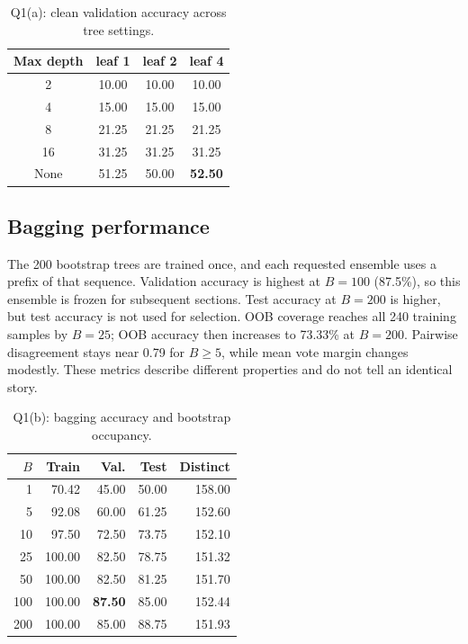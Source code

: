 \documentclass[10pt,twocolumn,letterpaper]{article}
\begin{document}
\begin{table}[t]
\centering
\caption{Q1(a): clean validation accuracy across tree settings.}
\label{tab:q1grid}
\small
\begin{tabular}{c|ccc}
\toprule
Max depth & leaf 1 & leaf 2 & leaf 4\\
\midrule
2 & 10.00 & 10.00 & 10.00\\
4 & 15.00 & 15.00 & 15.00\\
8 & 21.25 & 21.25 & 21.25\\
16 & 31.25 & 31.25 & 31.25\\
None & 51.25 & 50.00 & \textbf{52.50}\\
\bottomrule
\end{tabular}
\end{table}

\subsection{Bagging performance}
The 200 bootstrap trees are trained once, and each requested ensemble uses a prefix of that sequence. Validation accuracy is highest at $B=100$ (87.5\%), so this ensemble is frozen for subsequent sections. Test accuracy at $B=200$ is higher, but test accuracy is not used for selection. OOB coverage reaches all 240 training samples by $B=25$; OOB accuracy then increases to 73.33\% at $B=200$. Pairwise disagreement stays near 0.79 for $B\geq5$, while mean vote margin changes modestly. These metrics describe different properties and do not tell an identical story.

\begin{table}[t]
\centering
\caption{Q1(b): bagging accuracy and bootstrap occupancy.}
\label{tab:bag}
\small
\begin{tabular}{r|rrr|r}
\toprule
$B$ & Train & Val. & Test & Distinct\\
\midrule
1 & 70.42 & 45.00 & 50.00 & 158.00\\
5 & 92.08 & 60.00 & 61.25 & 152.60\\
10 & 97.50 & 72.50 & 73.75 & 152.10\\
25 & 100.00 & 82.50 & 78.75 & 151.32\\
50 & 100.00 & 82.50 & 81.25 & 151.70\\
100 & 100.00 & \textbf{87.50} & 85.00 & 152.44\\
200 & 100.00 & 85.00 & 88.75 & 151.93\\
\bottomrule
\end{tabular}
\end{table}
\end{document}
